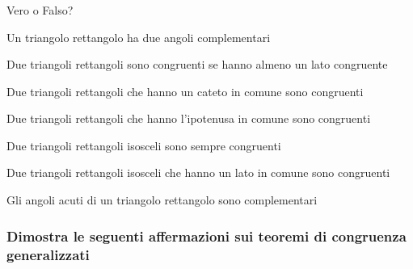 
\subsubsection*{}

\begin{esercizio}
\label{ese:3.52}
Vero o Falso?
\begin{enumeratea}
\item Un triangolo rettangolo ha due angoli 
complementari\hfill\boxV\quad\boxF
\item Due triangoli rettangoli sono congruenti se hanno almeno un 
lato congruente\hfill\boxV\quad\boxF
\item Due triangoli rettangoli che hanno un cateto in comune sono 
congruenti\hfill\boxV\quad\boxF
\item Due triangoli rettangoli che hanno l'ipotenusa in comune sono 
congruenti\hfill\boxV\quad\boxF
\item Due triangoli rettangoli isosceli sono sempre 
congruenti\hfill\boxV\quad\boxF
\item Due triangoli rettangoli isosceli che hanno un lato in comune 
sono congruenti\hfill\boxV\quad\boxF
\item Gli angoli acuti di un triangolo rettangolo sono 
complementari\hfill\boxV\quad\boxF
\end{enumeratea}
\end{esercizio}


\subsubsection*{Dimostra le seguenti affermazioni sui teoremi di 
congruenza generalizzati}

\vspace{-6pt}

